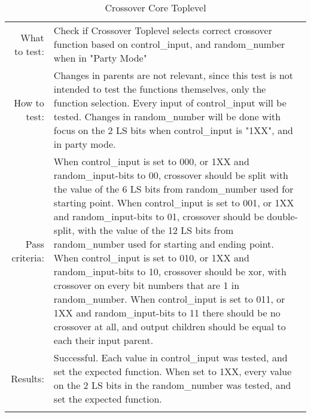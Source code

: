 \begin{table}[H]
  \begin{tabular}{r | p{8cm}}
    \noalign{\smallskip}\hline\noalign{\smallskip}
    
    What to test:  & Check if Crossover Toplevel selects correct crossover function
                     based on control\_input, and random\_number when in "Party Mode"\\

    \noalign{\smallskip}\hline\noalign{\smallskip}

    How to test:   &    Changes in parents are not relevant, since this test is not 
                        intended to test the functions themselves, only the function 
                        selection.
                        Every input of control\_input will be tested.
                        Changes in random\_number will be done with focus on the 2 LS 
                        bits when control\_input is "1XX", and in party mode.
                        \\
                      
    \noalign{\smallskip}\hline\noalign{\smallskip}

    Pass criteria: &    When control\_input is set to 000, or 1XX and random\_input-bits 
                        to 00, crossover should be split with the value of the 6 LS bits 
                        from random\_number used for starting point.
                        When control\_input is set to 001, or 1XX and random\_input-bits 
                        to 01, crossover should be double-split, with the value of the 
                        12 LS bits from random\_number used for starting and ending 
                        point.
                        When control\_input is set to 010, or 1XX and random\_input-bits 
                        to 10, crossover should be xor, with crossover on every bit 
                        numbers that are 1 in random\_number.
                        When control\_input is set to 011, or 1XX and random\_input-bits 
                        to 11 there should be no crossover at all, and output children 
                        should be equal to each their input parent.
                        \\
    \noalign{\smallskip}\hline\noalign{\smallskip}
    
    Results: &      Successful. 
                    Each value in control\_input was tested, and set the expected 
                    function. When set to 1XX, every value on the 2 LS bits in the 
                    random\_number was tested, and set the expected function.
                    \\
   \noalign{\smallskip}\hline\noalign{\smallskip}
  
  
  
  \end{tabular}
  \caption{Crossover Core Toplevel}
  \label{testing:components:genetic_pipeline:crossover_core_toplevel}
\end{table}
